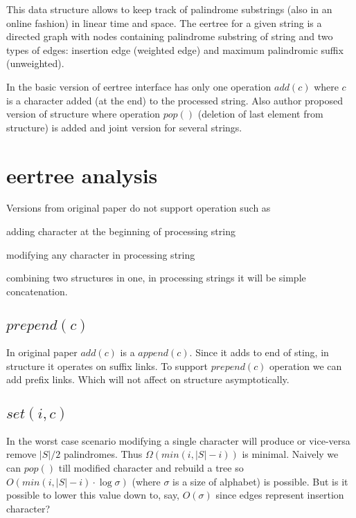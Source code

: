 This data structure allows to keep track of palindrome substrings (also in an online fashion) in linear time and space. The eertree for a given string is a directed graph with nodes containing palindrome substring of string and two types of edges: insertion edge (weighted edge)
and maximum palindromic suffix (unweighted).

In the basic version of eertree interface has only one operation $add(c)$ where $c$ is a character added (at the end) to the processed string. Also author proposed version of structure where operation $pop()$ (deletion of last element from structure) is added and joint version for several strings. 

\section{eertree analysis}
Versions from original paper do not support operation such as 

\begin{description}[align=right,labelwidth=1.5cm]
\item [prepend] adding character at the beginning of processing string
\item [set] modifying any character in processing string
\item [merge] combining two structures in one, in processing strings it will be simple concatenation.
\end{description}

\subsection{$prepend(c)$}
In original paper $add(c)$ is a $append(c)$. Since it adds to end of sting, in structure it operates on suffix links. 
To support $prepend(c)$ operation we can add prefix links. Which will not affect on structure asymptotically. 

\subsection{$set(i, c)$}
In the worst case scenario modifying a single character will produce or vice-versa remove $\lvert S \rvert/2$ palindromes.
Thus $\Omega(min(i, \lvert S \rvert - i))$ is minimal. Naively we can $pop()$ till modified character and rebuild a tree so $O(min(i, \lvert S \rvert - i) \cdot \log \sigma)$ (where $\sigma$ is a size of alphabet) is possible. But is it possible to lower this value down to, say, $O(\sigma)$ since edges represent insertion character?

